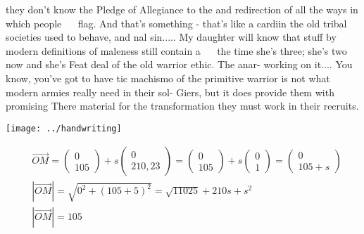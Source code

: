 \documentclass[a4paper,12pt]{amsart}
\begin{document}
they don't know the Pledge of Allegiance to the
and redirection of all the ways in which people $\quad$ flag. And that's something - that's like a cardiin the old tribal societies used to behave, and nal sin..... My daughter will know that stuff by modern definitions of maleness still contain a $\quad$ the time she's three; she's two now and she's
Feat deal of the old warrior ethic. The anar- working on it.... You know, you've got to have
tic machismo of the primitive warrior is not
what modern armies really need in their sol-
Giers, but it does provide them with promising
There material for the transformation they must work in their recruits.

\newpage

\texttt{[image: ../handwriting]}

\begin{equation}\nonumber
\begin{aligned}
&\overrightarrow{OM}=\left(\begin{array}{l}
0 \\
105
\end{array}\right)+s\left(\begin{array}{c}
0 \\
210,23
\end{array}\right)=\left(\begin{array}{l}
0 \\
105
\end{array}\right)+s\left(\begin{array}{l}
0 \\
1
\end{array}\right)=\left(\begin{array}{l}
0 \\
105+s
\end{array}\right)\\
&|\overrightarrow{OM}|=\sqrt{0^{2}+(105+5)^{2}}=\sqrt{11025}+210 s+s^{2}\\
&|\overrightarrow{OM}|=105
\end{aligned}
\end{equation}
\end{document}
